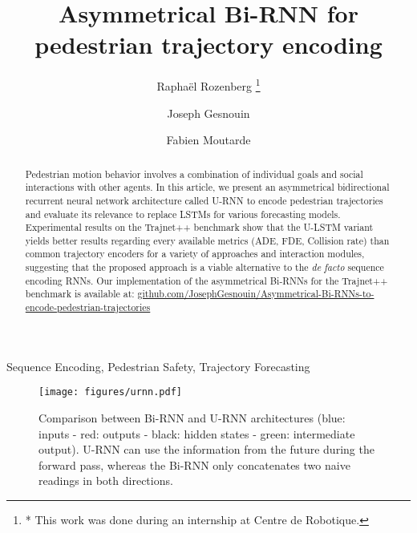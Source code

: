\documentclass[conference]{IEEEtran}
\begin{document}
\title{Asymmetrical Bi-RNN for pedestrian trajectory encoding
}

\author[1,2*]{Raphaël Rozenberg \thanks{* This work was done during an internship at Centre de Robotique.}}
\author[2,3]{Joseph Gesnouin}
\author[2]{Fabien Moutarde}




\maketitle

\begin{abstract}

Pedestrian motion behavior involves a combination of individual goals and social interactions with other agents. In this article, we present an asymmetrical bidirectional recurrent neural network architecture called U-RNN to encode pedestrian trajectories and evaluate its relevance to replace LSTMs for various forecasting models. Experimental results on the Trajnet++ benchmark show that the U-LSTM variant yields better results regarding every available metrics (ADE, FDE, Collision rate) than common trajectory encoders for a variety of approaches and interaction modules, suggesting that the proposed approach is a viable alternative to the \textit{de facto} sequence encoding RNNs.
Our implementation of the asymmetrical Bi-RNNs for the Trajnet++ benchmark is available at: \href{http://github.com/JosephGesnouin/Asymmetrical-Bi-RNNs-to-encode-pedestrian-trajectories}{github.com/JosephGesnouin/Asymmetrical-Bi-RNNs-to-encode-pedestrian-trajectories}
\end{abstract}

\begin{IEEEkeywords}
Sequence Encoding, Pedestrian Safety, Trajectory Forecasting
\end{IEEEkeywords}

\begin{figure*}[t]
\centerline{\texttt{[image: figures/urnn.pdf]}}
\caption{Comparison between Bi-RNN and U-RNN architectures (blue: inputs - red: outputs - black: hidden states - green: intermediate output).
U-RNN can use the information from the future during the forward pass, whereas the Bi-RNN only concatenates two naive readings in both directions.}
\label{ugru}
\end{figure*}
\end{document}
